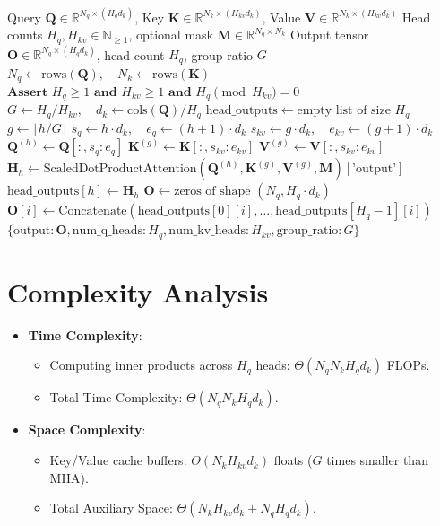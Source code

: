 \documentclass[11pt,a4paper]{article}
\theoremstyle{definition}
\begin{document}
\begin{algorithm}[H]
\caption{Grouped-Query Attention Forward Execution}
\label{alg:gqa}
\begin{algorithmic}[1]
\Require Query $\mathbf{Q} \in \mathbb{R}^{N_q \times (H_q d_k)}$, Key $\mathbf{K} \in \mathbb{R}^{N_k \times (H_{kv} d_k)}$, Value $\mathbf{V} \in \mathbb{R}^{N_k \times (H_{kv} d_k)}$
\Require Head counts $H_q, H_{kv} \in \mathbb{N}_{\ge 1}$, optional mask $\mathbf{M} \in \mathbb{R}^{N_q \times N_k}$
\Ensure Output tensor $\mathbf{O} \in \mathbb{R}^{N_q \times (H_q d_k)}$, head count $H_q$, group ratio $G$
\State $N_q \gets \text{rows}(\mathbf{Q}), \quad N_k \gets \text{rows}(\mathbf{K})$
\State $\textbf{Assert } H_q \ge 1 \textbf{ and } H_{kv} \ge 1 \textbf{ and } H_q \pmod{H_{kv}} = 0$
\State $G \gets H_q / H_{kv}, \quad d_k \gets \text{cols}(\mathbf{Q}) / H_q$
\State $\text{head\_outputs} \gets \text{empty list of size } H_q$
    \State $g \gets \lfloor h / G \rfloor$ 
    \State $s_q \gets h \cdot d_k, \quad e_q \gets (h + 1) \cdot d_k$
    \State $s_{kv} \gets g \cdot d_k, \quad e_{kv} \gets (g + 1) \cdot d_k$
    \State $\mathbf{Q}^{(h)} \gets \mathbf{Q}[:, s_q:e_q]$
    \State $\mathbf{K}^{(g)} \gets \mathbf{K}[:, s_{kv}:e_{kv}]$
    \State $\mathbf{V}^{(g)} \gets \mathbf{V}[:, s_{kv}:e_{kv}]$
    \State $\mathbf{H}_h \gets \text{ScaledDotProductAttention}(\mathbf{Q}^{(h)}, \mathbf{K}^{(g)}, \mathbf{V}^{(g)}, \mathbf{M})[\text{'output'}]$
    \State $\text{head\_outputs}[h] \gets \mathbf{H}_h$
\EndFor
\State $\mathbf{O} \gets \text{zeros of shape } (N_q, H_q \cdot d_k)$
    \State $\mathbf{O}[i] \gets \text{Concatenate}(\text{head\_outputs}[0][i], \dots, \text{head\_outputs}[H_q - 1][i])$
\EndFor
\State \Return $\{\text{output}: \mathbf{O}, \text{num\_q\_heads}: H_q, \text{num\_kv\_heads}: H_{kv}, \text{group\_ratio}: G\}$
\end{algorithmic}
\end{algorithm}

\section{Complexity Analysis}
\begin{itemize}
    \item \textbf{Time Complexity}:
    \begin{itemize}
        \item Computing inner products across $H_q$ heads: $\Theta(N_q N_k H_q d_k)$ FLOPs.
        \item Total Time Complexity: $\Theta(N_q N_k H_q d_k)$.
    \end{itemize}
    \item \textbf{Space Complexity}:
    \begin{itemize}
        \item Key/Value cache buffers: $\Theta(N_k H_{kv} d_k)$ floats ($G$ times smaller than MHA).
        \item Total Auxiliary Space: $\Theta(N_k H_{kv} d_k + N_q H_q d_k)$.
    \end{itemize}
\end{itemize}
\end{document}
